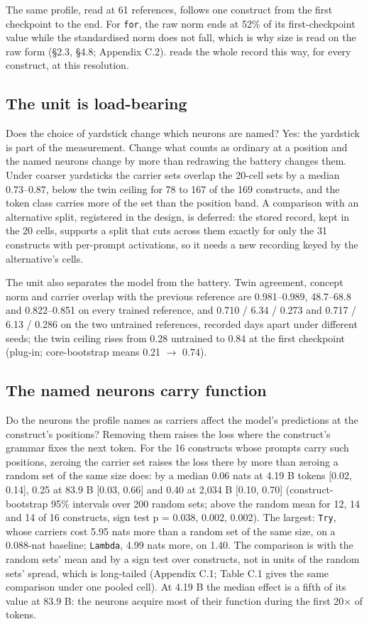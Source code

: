 \documentclass{article}
\begin{document}
The same profile, read at 61 references, follows one construct from the first checkpoint to the end. For \texttt{for}, the raw norm ends at 52\% of its first-checkpoint value while the standardised norm does not fall, which is why size is read on the raw form (\S2.3, \S4.8; Appendix C.2). \citet{wilam2026} reads the whole record this way, for every construct, at this resolution.

\subsection{The unit is load-bearing}

Does the choice of yardstick change which neurons are named? Yes: the yardstick is part of the measurement. Change what counts as ordinary at a position and the named neurons change by more than redrawing the battery changes them. Under coarser yardsticks the carrier sets overlap the 20-cell sets by a median 0.73--0.87, below the twin ceiling for 78 to 167 of the 169 constructs, and the token class carries more of the set than the position band. A comparison with an alternative split, registered in the design, is deferred: the stored record, kept in the 20 cells, supports a split that cuts across them exactly for only the 31 constructs with per-prompt activations, so it needs a new recording keyed by the alternative's cells.

The unit also separates the model from the battery. Twin agreement, concept norm and carrier overlap with the previous reference are 0.981--0.989, 48.7--68.8 and 0.822--0.851 on every trained reference, and 0.710 / 6.34 / 0.273 and 0.717 / 6.13 / 0.286 on the two untrained references, recorded days apart under different seeds; the twin ceiling rises from 0.28 untrained to 0.84 at the first checkpoint (plug-in; core-bootstrap means 0.21 $\rightarrow$ 0.74).

\subsection{The named neurons carry function}

Do the neurons the profile names as carriers affect the model's predictions at the construct's positions? Removing them raises the loss where the construct's grammar fixes the next token. For the 16 constructs whose prompts carry such positions, zeroing the carrier set raises the loss there by more than zeroing a random set of the same size does: by a median 0.06 nats at 4.19 B tokens [0.02, 0.14], 0.25 at 83.9 B [0.03, 0.66] and 0.40 at 2,034 B [0.10, 0.70] (construct-bootstrap 95\% intervals over 200 random sets; above the random mean for 12, 14 and 14 of 16 constructs, sign test p = 0.038, 0.002, 0.002). The largest: \texttt{Try}, whose carriers cost 5.95 nats more than a random set of the same size, on a 0.088-nat baseline; \texttt{Lambda}, 4.99 nats more, on 1.40. The comparison is with the random sets' mean and by a sign test over constructs, not in units of the random sets' spread, which is long-tailed (Appendix C.1; Table C.1 gives the same comparison under one pooled cell). At 4.19 B the median effect is a fifth of its value at 83.9 B: the neurons acquire most of their function during the first 20$\times$ of tokens.
\end{document}
